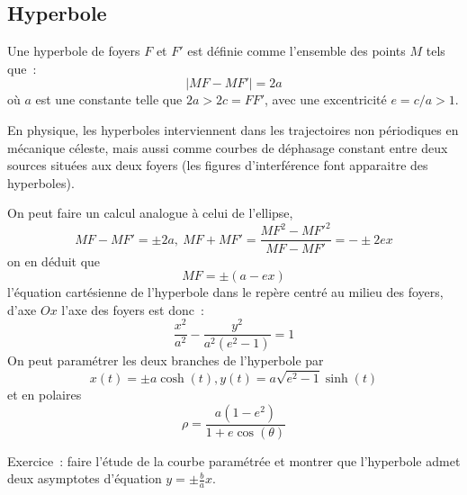 \documentclass[a4paper,11pt]{book}
\begin{document}
\begin{giacjshere}
\subsection{Hyperbole}
Une hyperbole de foyers $F$ et $F'$ est d\'efinie comme l'ensemble
des points $M$ tels que~:
$$ |MF-MF'|=2a$$
o\`u $a$ est une constante telle que $2a>2c=FF'$, avec une excentricit\'e
$e=c/a>1$.

En physique, les hyperboles interviennent dans les trajectoires non
p\'eriodiques en m\'ecanique c\'eleste, mais aussi comme courbes 
de d\'ephasage constant entre deux sources situ\'ees aux deux foyers
(les figures d'interf\'erence font apparaitre des hyperboles).

On peut faire un calcul analogue \`a celui de l'ellipse, 
$$ MF-MF'=\pm 2a, \ MF+MF'=\frac{MF^2-MF'^2}{MF-MF'}=-\pm 2ex$$
on en d\'eduit que
$$ MF=\pm (a-ex)$$
l'\'equation cart\'esienne de l'hyperbole dans le rep\`ere centr\'e au milieu
des foyers, d'axe $Ox$ l'axe des foyers est donc~:
$$ \frac{x^2}{a^2}-\frac{y^2}{a^2(e^2-1)}=1$$
On peut param\'etrer les deux branches de l'hyperbole par
$$ x(t)=\pm a\cosh(t), y(t)=a\sqrt{e^2-1} \sinh(t)$$
et en polaires
$$ \rho=\frac{a(1-e^2)}{1+e\cos(\theta)}$$

Exercice~: faire l'\'etude de la courbe param\'etr\'ee et montrer que
l'hyperbole admet deux asymptotes d'\'equation $y = \pm \frac{b}{a} x$.



\end{giacjshere}
\end{document}
